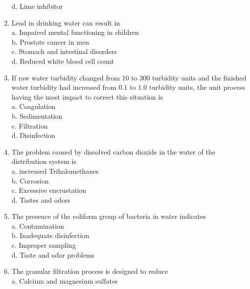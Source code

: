 \begin{enumerate}
d. Lime inhibitor\\


\item Lead in drinking water can result in\\


a. Impaired mental functioning in children\\

b. Prostate cancer in men\\

c. Stomach and intestinal disorders\\

d. Reduced white blood cell count\\

  \item If raw water turbidity changed from 10 to 300 turbidity units and the finished water turbidity had increased from $0.1$ to 1.0 turbidity units, the unit process having the most impact to correct this situation is\\
a. Coagulation\\
b. Sedimentation\\
c. Filtration\\
d. Disinfection\\

\item The problem caused by dissolved carbon dioxide in the water of the distribution system is\\
a. increased Trihalomethanes\\
b. Corrosion\\
c. Excessive encrustation\\
d. Tastes and odors\\

\item The presence of the coliform group of bacteria in water indicates\\

a. Contamination\\

b. Inadequate disinfection\\

c. Improper sampling\\

d. Taste and odor problems\\


  \item The granular filtration process is designed to reduce\\
a. Calcium and magnesium sulfates\\


\end{enumerate}
